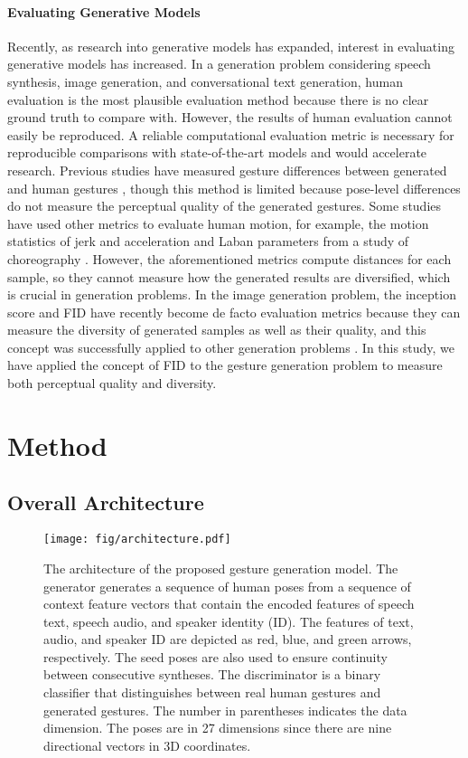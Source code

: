 \documentclass[acmtog]{acmart}
\begin{document}
\paragraph{Evaluating Generative Models}
Recently, as research into generative models has expanded, interest in evaluating generative models has increased. In a generation problem considering speech synthesis, image generation, and conversational text generation, human evaluation is the most plausible evaluation method because there is no clear ground truth to compare with. However, the results of human evaluation cannot easily be reproduced. A reliable computational evaluation metric is necessary for reproducible comparisons with state-of-the-art models and would accelerate research. Previous studies have measured gesture differences between generated and human gestures \cite{ginosar2019gestures, joo2019towards}, though this method is limited because pose-level differences do not measure the perceptual quality of the generated gestures. Some studies have used other metrics to evaluate human motion, for example, the motion statistics of jerk and acceleration \cite{kucherenko2019analyzing} and Laban parameters from a study of choreography \cite{aristidou2015folk}. However, the aforementioned metrics compute distances for each sample, so they cannot measure how the generated results are diversified, which is crucial in generation problems. In the image generation problem, the inception score \cite{salimans2016improved} and FID \cite{heusel2017gans} have recently become de facto evaluation metrics because they can measure the diversity of generated samples as well as their quality, and this concept was successfully applied to other generation problems \cite{unterthiner2018towards, kilgour2018fr}. In this study, we have applied the concept of FID to the gesture generation problem to measure both perceptual quality and diversity. 
 \section{Method} \label{sec:method}

\subsection{Overall Architecture}

\begin{figure}
  \centering
  \texttt{[image: fig/architecture.pdf]}
  \caption{The architecture of the proposed gesture generation model. The generator generates a sequence of human poses from a sequence of context feature vectors that contain the encoded features of speech text, speech audio, and speaker identity (ID). The features of text, audio, and speaker ID are depicted as red, blue, and green arrows, respectively. The seed poses are also used to ensure continuity between consecutive syntheses. The discriminator is a binary classifier that distinguishes between real human gestures and generated gestures. The number in parentheses indicates the data dimension. The poses are in 27 dimensions since there are nine directional vectors in 3D coordinates.}
  \label{fig:architecture}
\end{figure}
\end{document}
